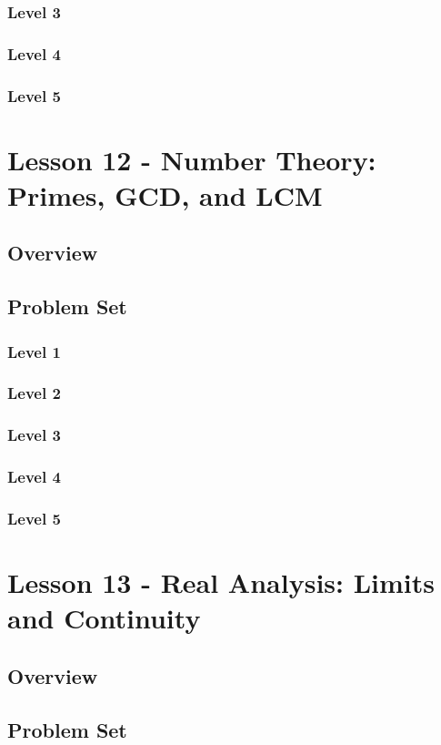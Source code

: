 \documentclass{article}
\begin{document}
\subsubsection{Level 3}
\subsubsection{Level 4}
\subsubsection{Level 5}
\pagebreak

\section{Lesson 12 - Number Theory: Primes, GCD, and LCM}
\subsection{Overview}
\subsection{Problem Set}
\subsubsection{Level 1}
\subsubsection{Level 2}
\subsubsection{Level 3}
\subsubsection{Level 4}
\subsubsection{Level 5}
\pagebreak

\section{Lesson 13 - Real Analysis: Limits and Continuity}
\subsection{Overview}
\subsection{Problem Set}
\end{document}
